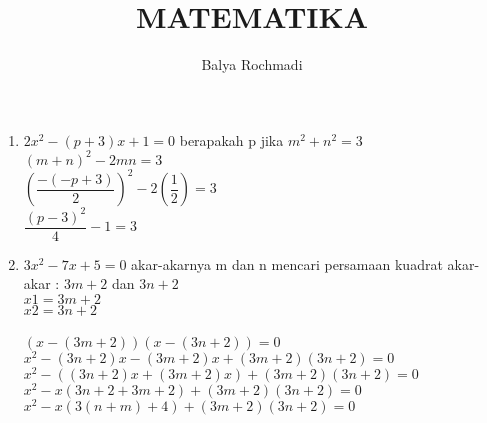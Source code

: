 \documentclass[12pt,a4paper]{article}
\author{Balya Rochmadi}
\title{MATEMATIKA}
\begin{document}
	\begin{enumerate}
		\item $2x^2-(p+3)x+1=0$ berapakah p jika $m^2+n^2=3$\\
		$(m+n)^2-2mn=3$\\
		$(\dfrac{-(-p+3)}{2})^2-2(\dfrac{1}{2})=3$\\
		$\dfrac{(p-3)^2}{4}-1=3$
		
		\item $3x^2-7x+5=0 $ akar-akarnya m dan n mencari persamaan kuadrat akar-akar : $3m+2$ dan $3n+2$
		\\
		$x1=3m+2$\\
		$x2=3n+2$\\
		\\
		$(x-(3m+2))(x-(3n+2))=0$\\
		$x^2-(3n+2)x-(3m+2)x+(3m + 2)(3n+2)=0$\\
		$x^2-((3n+2)x+(3m+2)x)+(3m+2)(3n+2)=0$\\
		$x^2-x(3n+2+3m+2)+(3m+2)(3n+2)=0$\\
		$x^2-x(3(n+m)+4)+(3m+2)(3n+2)=0$
		
		
	\end{enumerate}
\end{document}
